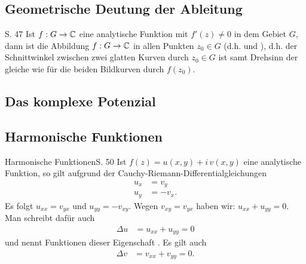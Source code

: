\subsection{Geometrische Deutung der Ableitung}

\begin{satz}{S. 47}
  Ist $f : G \to \mathbb{C}$ eine analytische Funktion mit $f'(z) \neq 0$ in dem Gebiet $G$, dann ist die Abbildung $f : G \to \mathbb{C}$ in allen Punkten $z_0 \in G$  (d.h.  und ), d.h. der Schnittwinkel zwischen zwei glatten Kurven durch $z_0 \in G$ ist samt Drehsinn der gleiche wie für die beiden Bildkurven durch $f(z_0)$.
\end{satz}



\subsection{Das komplexe Potenzial}





\subsection{Harmonische Funktionen}

\begin{bemerkung}{Harmonische Funktionen}{S. 50}
  Ist $f(z) = u(x,y) + i \, v(x,y)$ eine analytische Funktion, so gilt aufgrund der Cauchy-Riemann-Differentialgleichungen
  \begin{align}
    u_x &= v_y\\
    u_y &= - v_x .
  \end{align}
  Es folgt $u_{xx} = v_{yx}$ und $u_{yy} = -v_{xy}$.
  Wegen $v_{xy} = v_{yx}$ haben wir: $u_{xx} + u_{yy} = 0$.
  Man schreibt dafür auch
  \begin{align}
    \Delta u &= u_{xx} + u_{yy} = 0
  \end{align}
  und nennt Funktionen dieser Eigenschaft .
  Es gilt auch
  \begin{align}
    \Delta v &= v_{xx} + v_{yy} = 0 .
  \end{align}
\end{bemerkung}

